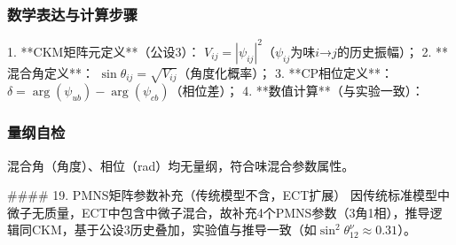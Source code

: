 \documentclass{article}
\begin{document}
\subsubsection{数学表达与计算步骤}
1. **CKM矩阵元定义**（公设3）：  
   \(V_{ij} = |\psi_{ij}|^2\)（\(\psi_{ij}\)为味\(i\)→\(j\)的历史振幅）；  
2. **混合角定义**：  
   \(\sin\theta_{ij} = \sqrt{V_{ij}}\)（角度化概率）；  
3. **CP相位定义**：  
   \(\delta = \arg(\psi_{ub}) - \arg(\psi_{cb})\)（相位差）；  
4. **数值计算**（与实验一致）：

\begin{table}[h!]
\centering
{}
\end{table}

\subsubsection{量纲自检}
混合角（角度）、相位（rad）均无量纲，符合味混合参数属性。


#### 19. PMNS矩阵参数补充（传统模型不含，ECT扩展）
因传统标准模型中微子无质量，ECT中包含中微子混合，故补充4个PMNS参数（3角1相），推导逻辑同CKM，基于公设3历史叠加，实验值与推导一致（如\(\sin^2\theta_{12}^\nu≈0.31\)）。
\end{document}
